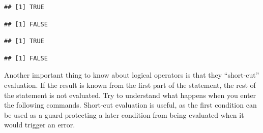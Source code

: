 \documentclass[krantz2]{krantz}\usepackage{knitr}
\begin{document}
\begin{knitrout}\footnotesize
{}\color{fgcolor}\begin{kframe}
\begin{alltt}
\end{alltt}
\begin{verbatim}
## [1] TRUE
\end{verbatim}
\begin{alltt}
\end{alltt}
\begin{verbatim}
## [1] FALSE
\end{verbatim}
\begin{alltt}
 \hlopt{&} 
\end{alltt}
\begin{verbatim}
## [1] TRUE
\end{verbatim}
\begin{alltt}
 \hlopt{&} 
\end{alltt}
\begin{verbatim}
## [1] FALSE
\end{verbatim}
\end{kframe}
\end{knitrout}

Another important thing to know about logical operators is that they ``short-cut'' evaluation. If the result is known from the first part of the statement, the rest of the statement is not evaluated. Try to understand what happens when you enter the following commands. Short-cut evaluation is useful, as the first condition can be used as a guard protecting a later condition from being evaluated when it would trigger an error.
\end{document}
